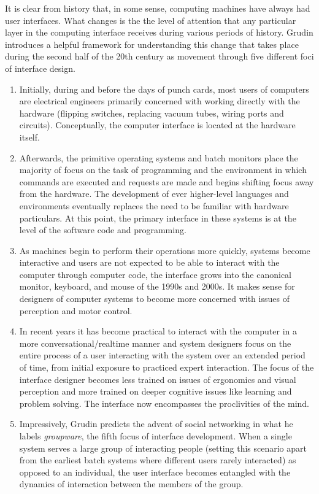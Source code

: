 It is clear from history that, in some sense, computing machines have always had user interfaces. What changes is the the level of attention that any particular layer in the computing interface receives during various periods of history. Grudin \cite{continuity1990} introduces a helpful framework for understanding this change that takes place during the second half of the 20th century as movement through five different foci of interface design. 

\begin{enumerate}
\item Initially, during and before the days of punch cards, most users of computers are electrical engineers primarily concerned with working directly with the hardware (flipping switches, replacing vacuum tubes, wiring ports and circuits). Conceptually, the computer interface is located at the hardware itself. 

\item Afterwards, the primitive operating systems and batch monitors place the majority of focus on the task of programming and the environment in which commands are executed and requests are made and begins shifting focus away from the hardware. The development of ever higher-level languages and environments eventually replaces the need to be familiar with hardware particulars. At this point, the primary interface in these systems is at the level of the software code and programming. 

\item As machines begin to perform their operations more quickly, systems become interactive and users are not expected to be able to interact with the computer through computer code, the interface grows into the canonical monitor, keyboard, and mouse of the 1990s and 2000s. It makes sense for designers of computer systems to become more concerned with issues of perception and motor control. 

\item In recent years it has become practical to interact with the computer in a more conversational/realtime manner and system designers focus on the entire process of a user interacting with the system over an extended period of time, from initial exposure to practiced expert interaction. The focus of the interface designer becomes less trained on issues of ergonomics and visual perception and more trained on deeper cognitive issues like learning and problem solving. The interface now encompasses the proclivities of the mind. 

\item Impressively, Grudin predicts the advent of social networking in what he labels \emph{groupware}, the fifth focus of interface development. When a single system serves a large group of interacting people (setting this scenario apart from the earliest batch systems where different users rarely interacted) as opposed to an individual, the user interface becomes entangled with the dynamics of interaction between the members of the group.
\end{enumerate}

